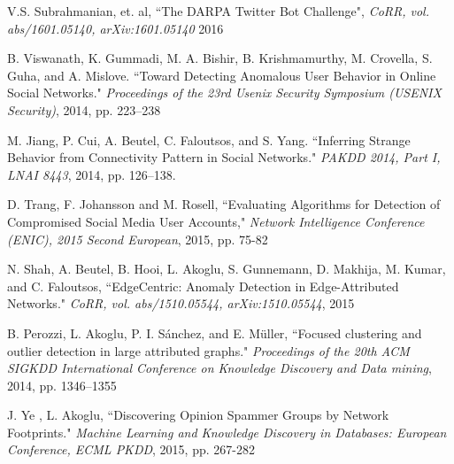 \documentclass[11pt, oneside]{article}   	%
\begin{document}
\begin{thebibliography}{123}
 V.S. Subrahmanian, et. al, ``The DARPA Twitter Bot Challenge", \emph{CoRR, vol. abs/1601.05140, arXiv:1601.05140} 2016

 B. Viswanath, K. Gummadi, M. A. Bishir, B. Krishmamurthy, M. Crovella, S. Guha, and A. Mislove. ``Toward Detecting Anomalous User Behavior in Online Social Networks." \emph{Proceedings of the 23rd Usenix Security Symposium (USENIX Security)}, 2014, pp. 223--238

 M. Jiang, P. Cui, A. Beutel, C. Faloutsos, and S. Yang. ``Inferring Strange Behavior from Connectivity Pattern in Social Networks." \emph{PAKDD 2014, Part I, LNAI 8443}, 2014, pp. 126--138.

 D. Trang, F. Johansson and M. Rosell, ``Evaluating Algorithms for Detection of Compromised Social Media User Accounts," \emph{Network Intelligence Conference (ENIC), 2015 Second European}, 2015, pp. 75-82

 N. Shah, A. Beutel, B. Hooi, L. Akoglu, S. Gunnemann, D. Makhija, M. Kumar, and C. Faloutsos, ``EdgeCentric: Anomaly Detection in Edge-Attributed Networks." \emph{CoRR, vol. abs/1510.05544, arXiv:1510.05544}, 2015

 B. Perozzi, L. Akoglu, P. I. Sánchez, and E. Müller, ``Focused clustering and outlier detection in large attributed graphs." \emph{Proceedings of the 20th ACM SIGKDD International Conference on Knowledge Discovery and Data mining}, 2014, pp. 1346--1355

 J. Ye , L. Akoglu, ``Discovering Opinion Spammer Groups by Network Footprints." \emph{Machine Learning and Knowledge Discovery in Databases: European Conference, ECML PKDD}, 2015, pp. 267-282


\end{thebibliography}
\end{document}
